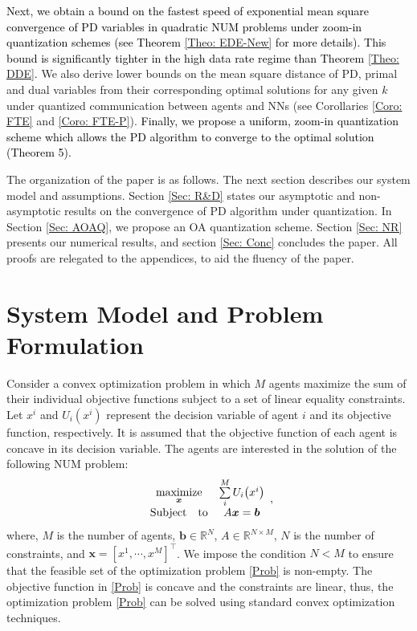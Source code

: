 \documentclass[10pt,twocolumn,twoside]{IEEEtran}
\begin{document}
\textcolor{black}{Next, we obtain a bound on the fastest speed of exponential mean square convergence of PD variables in quadratic NUM problems under zoom-in quantization schemes (see Theorem \ref{Theo: EDE-New} for more details). This bound is significantly  tighter in the high data rate regime than Theorem \ref{Theo: DDE}.} We also derive  lower bounds on the mean square distance of PD, primal and dual variables from their corresponding optimal solutions for any given $k$ under quantized communication between agents and NNs (see Corollaries \ref{Coro: FTE} and \ref{Coro: FTE-P}). \textcolor{black}{Finally, we propose a uniform, zoom-in quantization scheme which allows the PD algorithm to converge to the optimal solution (Theorem 5).}

 
The organization of the paper is as follows. The next section describes our system model and assumptions. Section \ref{Sec: R&D} states our asymptotic and non-asymptotic results on the convergence of PD algorithm under quantization. In Section \ref{Sec: AOAQ}, we propose an OA quantization scheme. Section \ref{Sec: NR} presents our numerical results, and section \ref{Sec: Conc} concludes the paper. All  proofs are relegated to the appendices, to aid the fluency of the paper.

\section{System Model and Problem Formulation}\label{Sec: SM}
Consider a convex optimization problem in which $M$ agents maximize the sum of their individual objective functions subject to a set of linear equality constraints. 
 Let $x^i$ and $U_{i}{\left({x^i}\right)}$ represent the decision variable of agent $i$ and its objective function, respectively. It is assumed that the objective function of each agent is concave in its decision variable. The agents are interested in the solution of the following NUM problem:
  \begin{eqnarray}\label{Prob}
 \begin{array}{cc}
\underset{{\ensuremath{\boldsymbol{{x}}}}}{\rm maximize} & \sum\limits_{i}^M U_i{\left({x^i}\right)}\\
{\rm Subject\quad to} &  A{\ensuremath{\boldsymbol{{x}}}}= {\ensuremath{\boldsymbol{{b}}}}\\
  \end{array},
 \end{eqnarray}
where, $M$ is the number of agents, ${\ensuremath{\boldsymbol{{b}}}}\in {\ensuremath{{\ensuremath{\mathbb{{R}}}}}}^N$, $A\in {\ensuremath{{\ensuremath{\mathbb{{R}}}}}}^{N\times M}$, $N$ is the number of constraints,  and ${\ensuremath{\boldsymbol{{x}}}}=\left[x^1,\cdots,x^M\right]^\top$. We impose the condition $N<M$ to ensure that the feasible set of the optimization problem \eqref{Prob} is non-empty. The objective function in \eqref{Prob} is concave and the constraints are linear, thus, the optimization problem \eqref{Prob} can be solved using standard convex optimization techniques.
\end{document}
